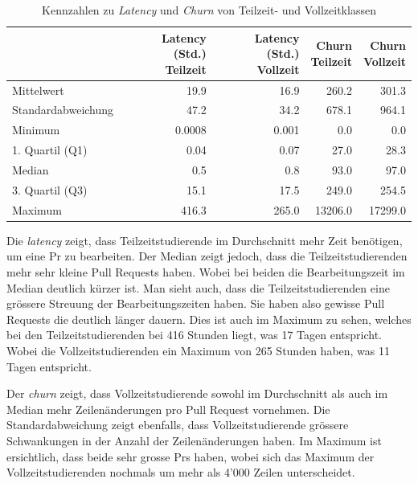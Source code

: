 \begin{table}[htbp]
    \centering
    \caption{Kennzahlen zu \textit{Latency} und \textit{Churn} von Teilzeit- und Vollzeitklassen}
    \begin{tabular}{@{}lrrrr@{}}
        \toprule
        \makecell{}&
        \makecell{\textbf{Latency (Std.)} \\ \textbf{Teilzeit}}&
        \makecell{\textbf{Latency (Std.)} \\ \textbf{Vollzeit}}&
        \makecell{\textbf{Churn} \\ \textbf{Teilzeit}}&
        \makecell{\textbf{Churn} \\ \textbf{Vollzeit}}\\
        \midrule
        Mittelwert & 19.9 & 16.9 & 260.2 & 301.3 \\
        Standardabweichung &  47.2 & 34.2  & 678.1 & 964.1 \\
        Minimum & 0.0008 & 0.001 & 0.0 & 0.0 \\
        1. Quartil (Q1) & 0.04 & 0.07 & 27.0 & 28.3\\
        Median & 0.5 & 0.8 & 93.0 & 97.0 \\
        3. Quartil (Q3) &  15.1 & 17.5 & 249.0 & 254.5 \\
        Maximum & 416.3 & 265.0 & 13206.0 & 17299.0 \\
        \bottomrule
    \end{tabular}
    \label{tab:deskriptive-kennzahlen-teilzeit-vollzeit}
\end{table}

Die \textit{latency} zeigt, dass Teilzeitstudierende im Durchschnitt mehr Zeit benötigen, um eine Pr zu bearbeiten. Der Median zeigt jedoch, dass die Teilzeitstudierenden mehr sehr kleine Pull Requests haben. Wobei bei beiden die Bearbeitungszeit im Median deutlich kürzer ist. Man sieht auch, dass die Teilzeitstudierenden eine grössere Streuung der Bearbeitungszeiten haben. Sie haben also gewisse Pull Requests die deutlich länger dauern. Dies ist auch im Maximum zu sehen, welches bei den Teilzeitstudierenden bei 416 Stunden liegt, was 17 Tagen entspricht. Wobei die Vollzeitstudierenden ein Maximum von 265 Stunden haben, was 11 Tagen entspricht.

Der \textit{churn} zeigt, dass Vollzeitstudierende sowohl im Durchschnitt als auch im Median mehr Zeilenänderungen pro Pull Request vornehmen. Die Standardabweichung zeigt ebenfalls, dass Vollzeitstudierende grössere Schwankungen in der Anzahl der Zeilenänderungen haben. Im Maximum ist ersichtlich, dass beide sehr grosse Prs haben, wobei sich das Maximum der Vollzeitstudierenden nochmals um mehr als 4'000 Zeilen unterscheidet.

